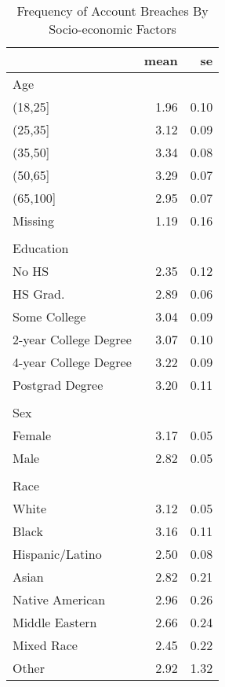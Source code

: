 \begin{table}[!htb]
\centering
\caption{Frequency of Account Breaches By Socio-economic Factors} 
\begingroup\small
\begin{tabular}{lrr}
  \hline
 & mean & se \\ 
  \hline
Age &  &  \\ 
  (18,25] & 1.96 & 0.10 \\ 
  (25,35] & 3.12 & 0.09 \\ 
  (35,50] & 3.34 & 0.08 \\ 
  (50,65] & 3.29 & 0.07 \\ 
  (65,100] & 2.95 & 0.07 \\ 
  Missing & 1.19 & 0.16 \\ 
   &  &  \\ 
  Education &  &  \\ 
  No HS & 2.35 & 0.12 \\ 
  HS Grad. & 2.89 & 0.06 \\ 
  Some College & 3.04 & 0.09 \\ 
  2-year College Degree & 3.07 & 0.10 \\ 
  4-year College Degree & 3.22 & 0.09 \\ 
  Postgrad Degree & 3.20 & 0.11 \\ 
   &  &  \\ 
  Sex &  &  \\ 
  Female & 3.17 & 0.05 \\ 
  Male & 2.82 & 0.05 \\ 
   &  &  \\ 
  Race &  &  \\ 
  White & 3.12 & 0.05 \\ 
  Black & 3.16 & 0.11 \\ 
  Hispanic/Latino & 2.50 & 0.08 \\ 
  Asian & 2.82 & 0.21 \\ 
  Native American & 2.96 & 0.26 \\ 
  Middle Eastern & 2.66 & 0.24 \\ 
  Mixed Race & 2.45 & 0.22 \\ 
  Other & 2.92 & 1.32 \\ 
   \hline
\end{tabular}
\endgroup
\end{table}
